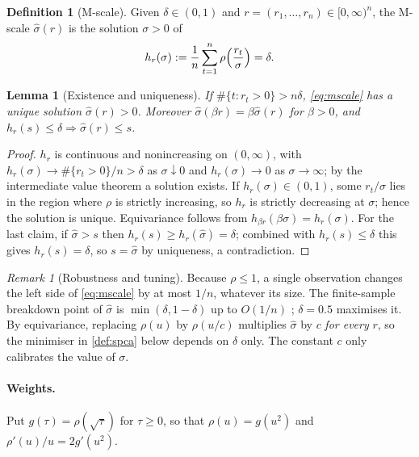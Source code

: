 \documentclass[11pt]{article}
\newtheorem{lemma}[theorem]{Lemma}
\theoremstyle{definition}
\newtheorem{definition}[theorem]{Definition}
\theoremstyle{remark}
\newtheorem{remark}[theorem]{Remark}
\begin{document}
\begin{definition}[M-scale]\label{def:mscale}
Given $\delta\in(0,1)$ and $r=(r_1,\dots,r_n)\in[0,\infty)^n$, the M-scale $\hat\sigma(r)$ is the solution
$\sigma>0$ of
\begin{equation}\label{eq:mscale}
h_r(\sigma):=\frac1n\sum_{t=1}^n\rho\Bigl(\frac{r_t}{\sigma}\Bigr)=\delta .
\end{equation}
\end{definition}

\begin{lemma}[Existence and uniqueness]\label{lem:mscale}
If $\#\{t:r_t>0\}>n\delta$, \eqref{eq:mscale} has a unique solution $\hat\sigma(r)>0$. Moreover
$\hat\sigma(\beta r)=\beta\hat\sigma(r)$ for $\beta>0$, and $h_r(s)\le\delta\Rightarrow\hat\sigma(r)\le s$.
\end{lemma}
\begin{proof}
$h_r$ is continuous and nonincreasing on $(0,\infty)$, with $h_r(\sigma)\to\#\{r_t>0\}/n>\delta$ as $\sigma\downarrow0$
and $h_r(\sigma)\to0$ as $\sigma\to\infty$; by the intermediate value theorem a solution exists. If
$h_r(\sigma)\in(0,1)$, some $r_t/\sigma$ lies in the region where $\rho$ is strictly increasing, so $h_r$ is strictly
decreasing at $\sigma$; hence the solution is unique. Equivariance follows from $h_{\beta r}(\beta\sigma)=h_r(\sigma)$.
For the last claim, if $\hat\sigma>s$ then $h_r(s)\ge h_r(\hat\sigma)=\delta$; combined with $h_r(s)\le\delta$ this
gives $h_r(s)=\delta$, so $s=\hat\sigma$ by uniqueness, a contradiction.
\end{proof}

\begin{remark}[Robustness and tuning]\label{rem:bdp}
Because $\rho\le1$, a single observation changes the left side of \eqref{eq:mscale} by at most $1/n$,
whatever its size. The finite-sample breakdown point of $\hat\sigma$ is $\min(\delta,1-\delta)$ up to $O(1/n)$
\citep{Huber1981,MaronnaEtAl2019}; $\delta=0.5$ maximises it. By equivariance, replacing $\rho(u)$ by $\rho(u/c)$
multiplies $\hat\sigma$ by $c$ \emph{for every} $r$, so the minimiser in \cref{def:spca} below depends on $\delta$
only. The constant $c$ only calibrates the value of $\sigma$.
\end{remark}

\paragraph{Weights.} Put $g(\tau)=\rho(\sqrt\tau)$ for $\tau\ge0$, so that $\rho(u)=g(u^2)$ and
$\rho'(u)/u=2g'(u^2)$.
\end{document}
